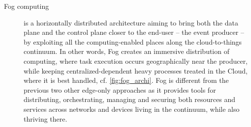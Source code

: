 \documentclass[11pt]{sdm}
\begin{document}
\begin{description}
	\item[Fog computing] is a horizontally distributed architecture aiming to bring both the data plane and the control plane closer to the end-user -- the event producer -- by exploiting all the computing-enabled places along the cloud-to-things continuum. In other words, Fog creates an immersive distribution of computing, where task execution occurs geographically near the producer, while keeping centralized-dependent heavy processes treated in the Cloud, where it is best handled, cf. \cref{fig:fog_archi}. Fog is different from the previous two other edge-only approaches as it provides tools for distributing, orchestrating, managing and securing both resources and services across networks and devices living in the continuum, while also thriving there.





\end{description}
\end{document}
